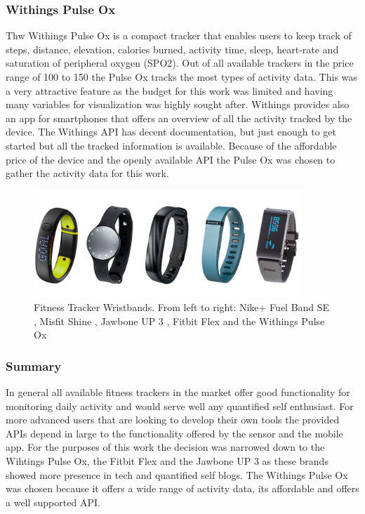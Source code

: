 \documentclass[../medieninformatik-arbeit.tex]{subfiles}
\begin{document}
\subsubsection*{Withings Pulse Ox}
Thw Withings Pulse Ox \cite{withingsProduct} is a compact tracker that enables users to keep track of steps, distance, elevation, calories burned, activity time, sleep, heart-rate and saturation of peripheral oxygen (SPO2). Out of all available trackers in the price range of \EUR{}100 to \EUR{}150 the Pulse Ox tracks the most types of activity data. This was a very attractive feature as the budget for this work was limited and having many variables for visualization was highly sought after. Withings provides also an app for smartphones that offers an overview of all the activity tracked by the device. The Withings API \cite{withingsApi} has decent documentation, but just enough to get started but all the tracked information is available. Because of the affordable price of the device and the openly available API the Pulse Ox was chosen to gather the activity data for this work.

\begin{figure}[h]
\captionsetup{width=0.9\textwidth}
\begin{center}
  \includegraphics[width=0.9\textwidth]{RelatedWork/img/bracelets}
  \caption{Fitness Tracker Wristbands. From left to right: Nike+ Fuel Band SE \cite{nikePlusFuelBand}, Misfit Shine \cite{misfitShine}, Jawbone UP 3 \cite{jawboneUpProduct}, Fitbit Flex \cite{fitbitProduct} and the Withings Pulse Ox \cite{withingsProduct}}
\label{fig:bracelets}
\end{center}
\end{figure}

\subsubsection*{Summary}
In general all available fitness trackers in the market offer good functionality for monitoring daily activity and would serve well any quantified self enthusiast. For more advanced users that are looking to develop their own tools the provided APIs depend in large to the functionality offered by the sensor and the mobile app. For the purposes of this work the decision was narrowed down to the Wihtings Pulse Ox, the Fitbit Flex and the Jawbone UP 3 as these brands showed more presence in tech and quantified self blogs. The Withings Pulse Ox was chosen because it offers a wide range of activity data, its affordable and offers a well supported API.
\end{document}

